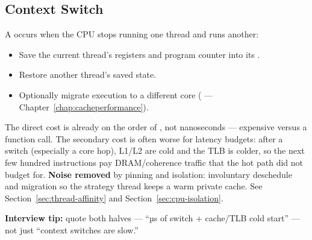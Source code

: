 \subsection{Context Switch}
\label{subsec:context-switch}
A  occurs when the CPU stops running one thread and runs another:
\begin{itemize}
    \item Save the current thread's registers and program counter into its .
    \item Restore another thread's saved state.
    \item Optionally migrate execution to a different core (  --- Chapter~\ref{chap:cacheperformance}).
\end{itemize}
The direct cost is already on the order of , not nanoseconds --- expensive 
versus a function call. The secondary cost is often worse for latency budgets: after a switch 
(especially a core hop), L1/L2 are cold and the TLB is colder, so the next few hundred 
instructions pay DRAM/coherence traffic that the hot path did not budget for.
\newline
\textbf{Noise removed} by pinning and isolation: involuntary deschedule and migration so the 
strategy thread keeps a warm private cache. See Section~\ref{sec:thread-affinity} and 
Section~\ref{sec:cpu-isolation}.
\par\noindent\textbf{Interview tip:} quote both halves --- ``µs of switch + cache/TLB cold start'' --- 
not just ``context switches are slow.''

